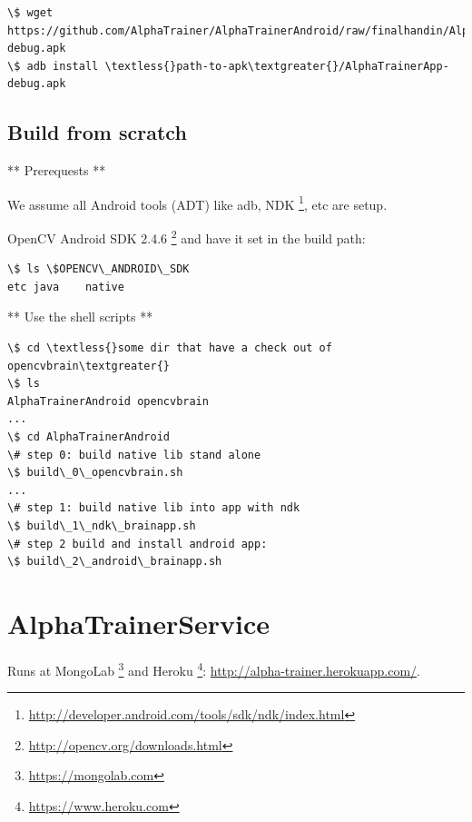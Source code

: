 \documentclass[a4paper,10pt,english,lof,lot,twoside]{puthesis}
\begin{document}
\begin{Verbatim}[commandchars=\\\{\}]
\$ wget https://github.com/AlphaTrainer/AlphaTrainerAndroid/raw/finalhandin/AlphaTrainerApp-debug.apk
\$ adb install \textless{}path-to-apk\textgreater{}/AlphaTrainerApp-debug.apk
\end{Verbatim}


\subsection{Build from scratch}
\label{appendix_software:build-from-scratch}
** Prerequests **

We assume all Android tools (ADT) like adb, NDK \footnote{
\href{http://developer.android.com/tools/sdk/ndk/index.html}{http://developer.android.com/tools/sdk/ndk/index.html}
}, etc are setup.

OpenCV Android SDK 2.4.6 \footnote{
\href{http://opencv.org/downloads.html}{http://opencv.org/downloads.html}
} and have it set
in the build path:

\begin{Verbatim}[commandchars=\\\{\}]
\$ ls \$OPENCV\_ANDROID\_SDK
etc java    native
\end{Verbatim}

** Use the shell scripts **

\begin{Verbatim}[commandchars=\\\{\}]
\$ cd \textless{}some dir that have a check out of opencvbrain\textgreater{}
\$ ls
AlphaTrainerAndroid opencvbrain
...
\$ cd AlphaTrainerAndroid
\# step 0: build native lib stand alone
\$ build\_0\_opencvbrain.sh
...
\# step 1: build native lib into app with ndk
\$ build\_1\_ndk\_brainapp.sh
\# step 2 build and install android app:
\$ build\_2\_android\_brainapp.sh
\end{Verbatim}


\section{AlphaTrainerService}
\label{appendix_software:alphatrainerservice}\label{appendix_software:appendix-alphatrainer-service}
Runs at MongoLab \footnote{
\href{https://mongolab.com}{https://mongolab.com}
} and Heroku \footnote{
\href{https://www.heroku.com}{https://www.heroku.com}
}: \href{http://alpha-trainer.herokuapp.com/}{http://alpha-trainer.herokuapp.com/}.
\end{document}
